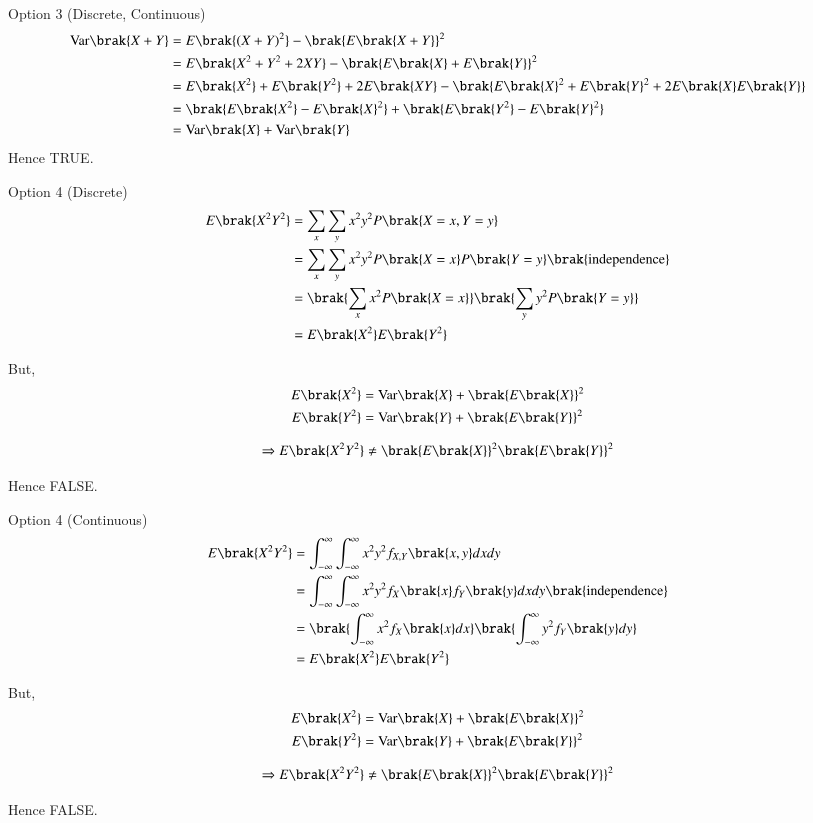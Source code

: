 \documentclass{beamer}
\begin{document}
\begin{frame}{Option 3 (Discrete, Continuous)}
\begin{align}
\text{Var}\brak{X+Y}
&= E\brak{(X+Y)^2} - \brak{E\brak{X+Y}}^2 \\
&= E\brak{X^2 + Y^2 + 2XY} - \brak{E\brak{X} + E\brak{Y}}^2 \\
&= E\brak{X^2} + E\brak{Y^2} + 2E\brak{XY} - \brak{E\brak{X}^2 + E\brak{Y}^2 + 2E\brak{X}E\brak{Y}} \\
&= \brak{E\brak{X^2} - E\brak{X}^2} + \brak{E\brak{Y^2} - E\brak{Y}^2} \\
&= \text{Var}\brak{X} + \text{Var}\brak{Y}
\end{align}
Hence TRUE.
\end{frame}

\begin{frame}{Option 4 (Discrete)}
\begin{align}
E\brak{X^2Y^2}
&= \sum_x \sum_y x^2 y^2 P\brak{X=x, Y=y} \\
&= \sum_x \sum_y x^2 y^2 P\brak{X=x}P\brak{Y=y} \brak{\text{independence}} \\
&= \brak{\sum_x x^2 P\brak{X=x}}\brak{\sum_y y^2 P\brak{Y=y}} \\
&= E\brak{X^2}E\brak{Y^2}
\end{align}

But,
\begin{align}
E\brak{X^2} &= \text{Var}\brak{X} + \brak{E\brak{X}}^2 \\
E\brak{Y^2} &= \text{Var}\brak{Y} + \brak{E\brak{Y}}^2
\end{align}

\begin{align}
\Rightarrow E\brak{X^2Y^2} \neq \brak{E\brak{X}}^2 \brak{E\brak{Y}}^2
\end{align}

Hence FALSE.
\end{frame}

\begin{frame}{Option 4 (Continuous)}
\begin{align}
E\brak{X^2Y^2}
&= \int_{-\infty}^{\infty} \int_{-\infty}^{\infty} x^2 y^2 f_{X,Y}\brak{x,y} dxdy \\
&= \int_{-\infty}^{\infty} \int_{-\infty}^{\infty} x^2 y^2 f_X\brak{x} f_Y\brak{y} dxdy \brak{\text{independence}} \\
&= \brak{\int_{-\infty}^{\infty} x^2 f_X\brak{x} dx}
   \brak{\int_{-\infty}^{\infty} y^2 f_Y\brak{y} dy} \\
&= E\brak{X^2}E\brak{Y^2}
\end{align}

But,
\begin{align}
E\brak{X^2} &= \text{Var}\brak{X} + \brak{E\brak{X}}^2 \\
E\brak{Y^2} &= \text{Var}\brak{Y} + \brak{E\brak{Y}}^2
\end{align}

\begin{align}
\Rightarrow E\brak{X^2Y^2} \neq \brak{E\brak{X}}^2 \brak{E\brak{Y}}^2
\end{align}

Hence FALSE.
\end{frame}
\end{document}
